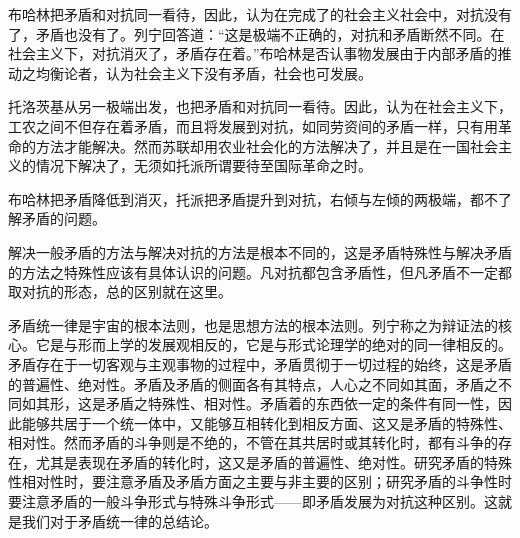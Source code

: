 布哈林把矛盾和对抗同一看待，因此，认为在完成了的社会主义社会中，对抗没有了，矛盾也没有了。列宁回答道：“这是极端不正确的，对抗和矛盾断然不同。在社会主义下，对抗消灭了，矛盾存在着。”布哈林是否认事物发展由于内部矛盾的推动之均衡论者，认为社会主义下没有矛盾，社会也可发展。

托洛茨基从另一极端出发，也把矛盾和对抗同一看待。因此，认为在社会主义下，工农之间不但存在着矛盾，而且将发展到对抗，如同劳资间的矛盾一样，只有用革命的方法才能解决。然而苏联却用农业社会化的方法解决了，并且是在一国社会主义的情况下解决了，无须如托派所谓要待至国际革命之时。

布哈林把矛盾降低到消灭，托派把矛盾提升到对抗，右倾与左倾的两极端，都不了解矛盾的问题。

解决一般矛盾的方法与解决对抗的方法是根本不同的，这是矛盾特殊性与解决矛盾的方法之特殊性应该有具体认识的问题。凡对抗都包含矛盾性，但凡矛盾不一定都取对抗的形态，总的区别就在这里。

矛盾统一律是宇宙的根本法则，也是思想方法的根本法则。列宁称之为辩证法的核心。它是与形而上学的发展观相反的，它是与形式论理学的绝对的同一律相反的。矛盾存在于一切客观与主观事物的过程中，矛盾贯彻于一切过程的始终，这是矛盾的普遍性、绝对性。矛盾及矛盾的侧面各有其特点，人心之不同如其面，矛盾之不同如其形，这是矛盾之特殊性、相对性。矛盾着的东西依一定的条件有同一性，因此能够共居于一个统一体中，又能够互相转化到相反方面、这又是矛盾的特殊性、相对性。然而矛盾的斗争则是不绝的，不管在其共居时或其转化时，都有斗争的存在，尤其是表现在矛盾的转化时，这又是矛盾的普遍性、绝对性。研究矛盾的特殊性相对性时，要注意矛盾及矛盾方面之主要与非主要的区别；研究矛盾的斗争性时要注意矛盾的一般斗争形式与特殊斗争形式——即矛盾发展为对抗这种区别。这就是我们对于矛盾统一律的总结论。


